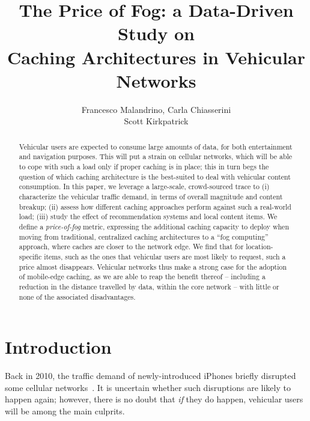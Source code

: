 \documentclass{sig-alternate-05-2015}
\begin{document}
\title{The Price of Fog: a Data-Driven Study on\\
Caching Architectures in Vehicular Networks
}


\author{
\alignauthor
Francesco Malandrino, Carla Chiasserini\\
\alignauthor Scott Kirkpatrick\\
}

\maketitle
\begin{abstract}

Vehicular users are expected to consume large amounts of data, for both entertainment and navigation purposes. This will put a strain on cellular networks, which will be able to cope with such a load only if proper caching is in place; this in turn begs the question of which caching architecture is the best-suited to deal with vehicular content consumption. In this paper, we leverage a large-scale, crowd-sourced trace to (i) characterize the vehicular traffic demand, in terms of overall magnitude and content breakup; (ii) assess how different caching approaches perform against such a real-world load; (iii) study the effect of recommendation systems and local content items. We define a {\em price-of-fog} metric, expressing the additional caching capacity to deploy when moving from traditional, centralized caching architectures to a ``fog computing'' approach, where caches are closer to the network edge. We find that for location-specific items, such as the ones that vehicular users are most likely to request, such a price almost disappears.
Vehicular networks thus make a strong case for the adoption of mobile-edge caching, as we are able to reap the benefit thereof -- including a reduction in the distance travelled by data, within the core network -- with little or none of the associated disadvantages.
\end{abstract}

\section{Introduction}

Back in 2010, the traffic demand of newly-introduced iPhones briefly disrupted some cellular networks~\cite{arnaud}. It is uncertain whether such disruptions are likely to happen again; however, there is no doubt that {\em if} they do happen, vehicular users will be among the main culprits.
\end{document}
